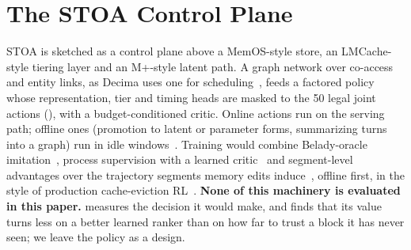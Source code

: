 \section{The STOA Control Plane}
\label{sec:arch}

STOA is sketched as a control plane above a MemOS-style store, an LMCache-style tiering layer and an
M+-style latent path. A graph network over co-access and entity links, as Decima uses one for
scheduling~\cite{S5_mao2019decima}, feeds a factored policy whose representation, tier and timing heads
are masked to the 50 legal joint actions (), with a budget-conditioned critic. Online
actions run on the serving path; offline ones (promotion to latent or parameter forms, summarizing turns
into a graph) run in idle windows~\cite{F4_fang2025lightmem,F3_lin2025sleeptime}. Training would combine
Belady-oracle imitation~\cite{S2_liu2020parrot}, process supervision with a learned
critic~\cite{F20_xiong2025raggym} and segment-level advantages over the trajectory segments memory edits
induce~\cite{F7_zhang2025memoryasaction}, offline first, in the style of production cache-eviction
RL~\cite{S4_coldrl2025}. \textbf{None of this machinery is evaluated in this paper.} 
measures the decision it would make, and finds that its value turns less on a better learned ranker than
on how far to trust a block it has never seen; we leave the policy as a design.
